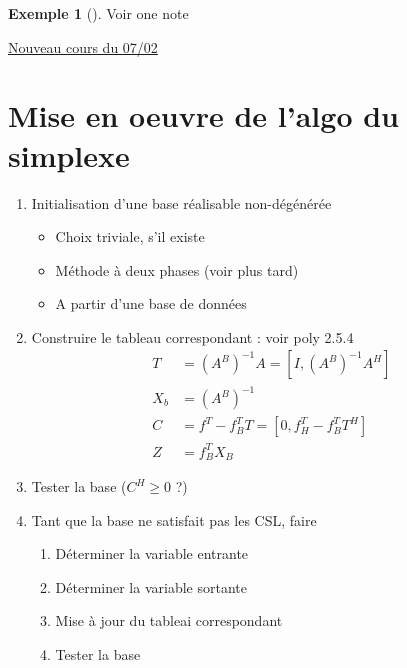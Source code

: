 \documentclass{article}
\theoremstyle{plain}%
\theoremstyle{definition}
\newtheorem{exmp}{Exemple}[section]
\theoremstyle{remark}
\begin{document}
\begin{exmp}[]
    Voir one note
\end{exmp}

\underline{Nouveau cours du 07/02} \\

\section{Mise en oeuvre de l'algo du simplexe}
\begin{enumerate}
    \item Initialisation d'une base réalisable non-dégénérée 
        \begin{itemize}
            \item Choix triviale, s'il existe 
            \item Méthode à deux phases (voir plus tard)
            \item A partir d'une base de données
        \end{itemize}
    \item Construire le tableau correspondant : voir poly 2.5.4
        \begin{align*}
            T &= (A^B)^{-1}A = [I, (A^B)^{-1}A^H] \\
            X_b &= (A^B)^{-1} \\
            C &= f^T - f^T_{B}T = [0, f^T_H - f^T_{B}T^H] \\
            Z &= f^T_B X_B
        \end{align*}
    \item Tester la base ($ C^H \geq 0 $ ?)
    \item Tant que la base ne satisfait pas les CSL, faire 
        \begin{enumerate}
            \item Déterminer la variable entrante 
            \item Déterminer la variable sortante
            \item Mise à jour du tableai correspondant 
            \item Tester la base
        \end{enumerate}
\end{enumerate}
\end{document}
